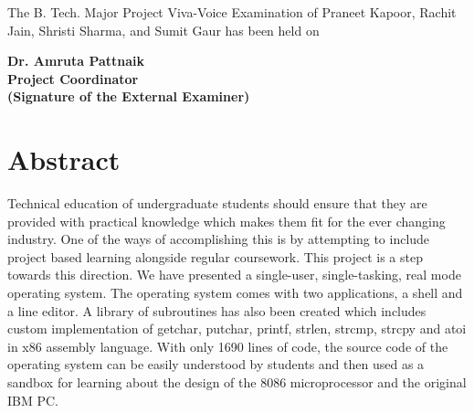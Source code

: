 The B. Tech. Major Project Viva-Voice Examination of Praneet Kapoor, Rachit Jain, Shristi Sharma, and Sumit Gaur has been held on\\[\baselineskip]
\begin{multicols}{2}
\centering\textbf{\hspace{-2.5cm}Dr. Amruta Pattnaik\\\hspace{-2.5cm}Project Coordinator}\\
\columnbreak
\centering\textbf{\hspace{1cm}(Signature of the External Examiner)}\\
\end{multicols}


\newpage
\chapter*{\centering Abstract}
Technical education of undergraduate students should ensure that they are provided with practical knowledge which makes them fit for the ever changing industry. One of the ways of accomplishing this is by attempting to include project based learning alongside regular coursework. This project is a step towards this direction. We have presented a single-user, single-tasking, real mode operating system. The operating system comes with two applications, a shell and a line editor. A library of subroutines has also been created which includes custom implementation of getchar, putchar, printf, strlen, strcmp, strcpy and atoi in x86 assembly language. With only 1690 lines of code, the source code of the operating system can be easily understood by students and then used as a sandbox for learning about the design of the 8086 microprocessor and the original IBM PC.

\newpage
